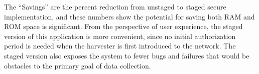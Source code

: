 The ``Savings'' are the percent reduction from unstaged to staged secure implementation, and
these numbers show the potential for saving both RAM and ROM space is significant. From the
perspective of user experience, the staged version of this application is more convenient, since
no initial authorization period is needed when the harvester is first introduced to the network.
The staged version also exposes the system to fewer bugs and failures that would be obstacles to
the primary goal of data collection.

